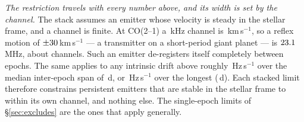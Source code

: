 \emph{The restriction travels with every number above, and its width is set
by the channel.} The stack assumes an emitter whose velocity is steady in the
stellar frame, and a channel is finite. At CO(2--1) a \StkRefChanKHz\,kHz
channel is
\StkProxTolKms\,km\,s$^{-1}$, so a reflex motion of
$\pm30$\,km\,s$^{-1}$ --- a transmitter on a short-period
giant planet --- is $23.1$\,MHz, about \StkReflexChan{} channels.
Such an emitter de-registers itself completely between epochs. The same
applies to any intrinsic drift above roughly \StkDriftTolHzS\,Hz\,s$^{-1}$
over the median inter-epoch span of \StkSpanMedD\,d, or
\StkDriftTolTightHzS\,Hz\,s$^{-1}$ over the longest (\StkSpanMaxD\,d). Each stacked limit therefore constrains persistent emitters that are stable
in the stellar frame to within its own channel, and nothing else. The
single-epoch limits of \S\ref{sec:excludes} are the ones that apply
generally.
